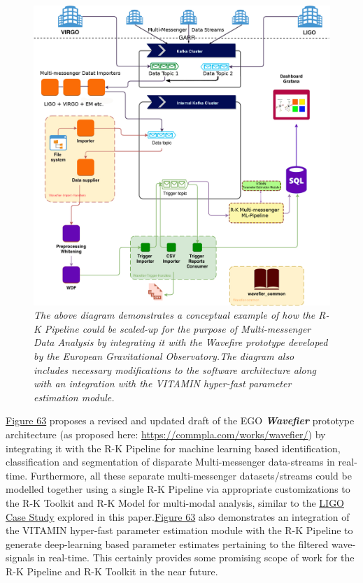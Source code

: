  \begin{figure}[H]
	\centering
	\includegraphics[width=1.0\linewidth]{images/RK_Pipeline_with_Wavefire_VITAMIN.jpg}
	\caption{\textit{The above diagram demonstrates a conceptual example of how the R-K Pipeline could be scaled-up for the purpose of Multi-messenger Data Analysis by integrating it with the Wavefire prototype developed by the European Gravitational Observatory.The diagram also includes necessary modifications to the software architecture along with an integration with the VITAMIN hyper-fast parameter estimation module. }}
	\label{fig:Wavefier_RKPipeline}
\end{figure}

\hyperref[fig:Wavefier_RKPipeline]{Figure 63} proposes a revised and updated draft of the EGO \textbf{\textit{Wavefier}} prototype architecture (as proposed here: \hyperlink{website}{https://commpla.com/works/wavefier/}) by integrating it with the R-K Pipeline for machine learning based identification, classification and segmentation of disparate Multi-messenger data-streams in real-time. Furthermore, all these separate multi-messenger datasets/streams could be modelled together using a single R-K Pipeline via appropriate customizations to the R-K Toolkit and R-K Model for multi-modal analysis, similar to the \hyperref[sec:LIGO_Data_Analysis]{LIGO Case Study} explored in this paper.\hyperref[fig:Wavefier_RKPipeline]{Figure 63} also demonstrates an integration of the VITAMIN hyper-fast parameter estimation module with the R-K Pipeline to generate deep-learning based parameter estimates pertaining to the filtered wave-signals in real-time. This certainly provides some promising scope of work for the R-K Pipeline and R-K Toolkit in the near future.

